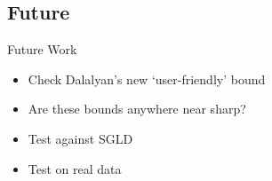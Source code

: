 \documentclass[aspectratio=169]{beamer}
\begin{document}
\subsection{Future}

\begin{frame}{Future Work}
\begin{itemize}
    \item Check Dalalyan's new `user-friendly' bound
    \item Are these bounds anywhere near sharp?
    \item Test against SGLD
    \item Test on real data
\end{itemize}
    
\end{frame}

\end{document}
